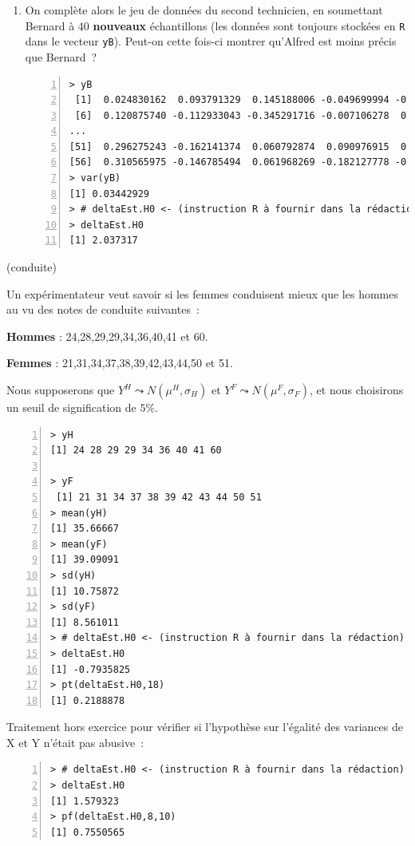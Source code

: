 \documentclass[10pt]{report}
\begin{document}
\begin{exercice}
\begin{enumerate}
\item On complète alors le jeu de données du second technicien, en soumettant Bernard à 40 \textbf{nouveaux} échantillons (les données sont toujours stockées en \texttt{R} dans le vecteur \texttt{yB}). Peut-on cette fois-ci montrer qu'Alfred est moins précis que Bernard~?

\IndicR
\begin{Verbatim}[frame=leftline,fontfamily=tt,fontshape=n,numbers=left]
> yB
 [1]  0.024830162  0.093791329  0.145188006 -0.049699994 -0.153214255
 [6]  0.120875740 -0.112933043 -0.345291716 -0.007106278  0.122016115
...
[51]  0.296275243 -0.162141374  0.060792874  0.090976915  0.119856496
[56]  0.310565975 -0.146785494  0.061968269 -0.182127778 -0.187890277
> var(yB)
[1] 0.03442929
> # deltaEst.H0 <- (instruction R à fournir dans la rédaction)
> deltaEst.H0
[1] 2.037317
\end{Verbatim}




\end{enumerate}
\end{exercice}

\begin{exercice} (conduite)

Un exp{\'e}rimentateur veut savoir si les femmes conduisent mieux que les
hommes au vu des notes de conduite suivantes~:
 
{\bf Hommes} : 24,28,29,29,34,36,40,41 et 60.

{\bf Femmes }: 21,31,34,37,38,39,42,43,44,50 et 51.

Nous supposerons que $Y^{H}\leadsto N\left( \mu^{H} ,\sigma_{H} \right) $ et $Y^{F}\leadsto N\left( \mu^{F},\sigma_{F} \right) $, et nous choisirons un seuil de signification de $5\%$.


\IndicR
\begin{Verbatim}[frame=leftline,fontfamily=tt,fontshape=n,numbers=left]
> yH
[1] 24 28 29 29 34 36 40 41 60

> yF
 [1] 21 31 34 37 38 39 42 43 44 50 51
> mean(yH)
[1] 35.66667
> mean(yF)
[1] 39.09091
> sd(yH)
[1] 10.75872
> sd(yF)
[1] 8.561011
> # deltaEst.H0 <- (instruction R à fournir dans la rédaction)
> deltaEst.H0
[1] -0.7935825
> pt(deltaEst.H0,18)
[1] 0.2188878
\end{Verbatim}




Traitement hors exercice pour v{\'e}rifier si l'hypoth{\`e}se sur l'{\'e}galit{\'e} des variances de X et Y n'{\'e}tait pas abusive~:

\IndicR
\begin{Verbatim}[frame=leftline,fontfamily=tt,fontshape=n,numbers=left]
> # deltaEst.H0 <- (instruction R à fournir dans la rédaction)
> deltaEst.H0
[1] 1.579323
> pf(deltaEst.H0,8,10)
[1] 0.7550565
\end{Verbatim}




\end{exercice}
\end{document}
